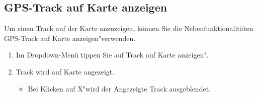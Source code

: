 \documentclass{article}
\begin{document}
\subsection{GPS-Track auf Karte anzeigen}
	Um einen Track auf der Karte anzuzeigen, können Sie die Nebenfunktionalitäten \glqq GPS-Track auf Karte anzeigen"\space verwenden.\\
	\begin{enumerate}
		\item Im Dropdown-Menü tippen Sie auf \glqq Track auf Karte anzeigen".
		\item Track wird auf Karte angezeigt.
			\begin{itemize}
				\item Bei Klicken auf \glqq X"\space wird der Angezeigte Track ausgeblendet.
			\end{itemize}
	\end{enumerate}
\end{document}
